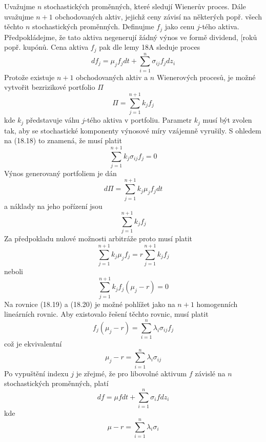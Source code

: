 \documentclass[a4paper]{book}
\begin{document}
Uvažujme $n$ stochastických proměnných, které sledují Wienerův proces. Dále uvažujme $n+1$ obchodovaných aktiv, jejichž ceny závisí na některých popř. všech těchto $n$ stochastických proměnných. Definujme $f_j$ jako cenu $j$-tého aktiva. Předpokládejme, že tato aktiva negenerují žádný výnos ve formě dividend, [roků popř. kupónů. Cena aktiva $f_j$ pak dle lemy 18A sleduje proces
\begin{equation}
d f_j = \mu_j f_j dt + \sum^n_{i=1} \sigma_{ij}f_j d z_i
\end{equation}
Protože existuje $n+1$ obchodovaných aktiv a $n$ Wienerových procesů, je možné vytvořit bezrizikové portfolio $\Pi$
\begin{equation*}
\Pi = \sum^{n+1}_{j=1}k_j f_j
\end{equation*}
kde $k_j$ představuje váhu $j$-tého aktiva v portfoliu. Parametr $k_j$ musí být zvolen tak, aby se stochastické komponenty výnosové míry vzájemně vyrušily. S ohledem na (18.18) to znamená, že musí platit
\begin{equation}
\sum^{n+1}_{j=1} k_j \sigma_{ij} f_j = 0
\end{equation}
Výnos generovaný portfoliem je dán
\begin{equation*}
d \Pi = \sum^{n+1}_{j=1} k_j \mu_j f_j dt
\end{equation*}
a náklady na jeho pořízení jsou
\begin{equation*}
\sum^{n+1}_{j=1} k_j f_j
\end{equation*}
Za předpokladu nulové možnosti arbitráže proto musí platit
\begin{equation*}
\sum^{n+1}_{j=1}k_j \mu_j f_j = r \sum^{n+1}_{j=1} k_j f_j
\end{equation*}
neboli
\begin{equation}
\sum^{n+1}_{j=1} k_j f_j (\mu_j - r) = 0
\end{equation}
Na rovnice (18.19) a (18.20) je možné pohlížet jako na $n+1$ homogenních lineárních rovnic. Aby existovalo řešení těchto rovnic, musí platit
\begin{equation}
f_j(\mu_j - r) = \sum^{n}_{i=1} \lambda_i \sigma_{ij} f_j
\end{equation}
což je ekvivalentní
\begin{equation}
\mu_j - r = \sum^n_{i=1} \lambda_i \sigma_{ij}
\end{equation}
Po vypuštění indexu $j$ je zřejmé, že pro libovolné aktivum $f$ závislé na $n$ stochastických proměnných, platí
\begin{equation}
df = \mu f dt + \sum^{n}_{i=1} \sigma_i f d z_i
\end{equation}
kde
\begin{equation}
\mu - r = \sum^n_{i=1} \lambda_i \sigma_i
\end{equation}
\end{document}
